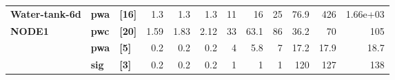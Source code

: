 \begin{tabular}{lllrrrrrrrrr}
\textbf{Water-tank-6d} & \textbf{pwa} & \textbf{[16]} &              1.3 &    1.3 &    1.3 &     11 &    16 &     25 &   76.9 &   426 & 1.66e+03 \\
\textbf{NODE1} & \textbf{pwc} & \textbf{[20]} &             1.59 &   1.83 &   2.12 &     33 &  63.1 &     86 &   36.2 &    70 &      105 \\
      & \textbf{pwa} & \textbf{[5]} &              0.2 &    0.2 &    0.2 &      4 &   5.8 &      7 &   17.2 &  17.9 &     18.7 \\
      & \textbf{sig} & \textbf{[3]} &              0.2 &    0.2 &    0.2 &      1 &     1 &      1 &    120 &   127 &      138 \\
\bottomrule
\end{tabular}
